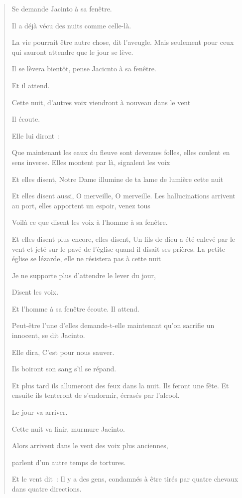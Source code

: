 \begin{quote}
Se demande Jacinto à sa fenêtre.

Il a déjà vécu des nuits comme celle-là.

La vie pourrait être autre chose, dit l'aveugle. Mais seulement pour
ceux qui sauront attendre que le jour se lève.

Il se lèvera bientôt, pense Jacicnto à sa fenêtre.

Et il attend.

Cette nuit, d'autres voix viendront à nouveau dans le vent

Il écoute.

Elle lui diront~:

Que maintenant les eaux du fleuve sont devenues folles, elles coulent en
sens inverse. Elles montent par là, signalent les voix

Et elles disent, Notre Dame illumine de ta lame de lumière cette nuit

Et elles disent aussi, O merveille, O merveille. Les hallucinations
arrivent au port, elles apportent un espoir, venez tous

Voilà ce que disent les voix à l'homme à sa fenêtre.

Et elles disent plus encore, elles disent, Un fils de dieu a été enlevé
par le vent et jeté sur le pavé de l'église quand il disait ses prières.
La petite église se lézarde, elle ne résistera pas à cette nuit

Je ne supporte plus d'attendre le lever du jour,

Disent les voix.

Et l'homme à sa fenêtre écoute. Il attend.

Peut-être l'une d'elles demande-t-elle maintenant qu'on sacrifie un
innocent, se dit Jacinto.

Elle dira, C'est pour nous sauver.

Ils boiront son sang s'il se répand.

Et plus tard ils allumeront des feux dans la nuit. Ils feront une fête.
Et ensuite ils tenteront de s'endormir, écrasés par l'alcool.

Le jour va arriver.

Cette nuit va finir, murmure Jacinto.

Alors arrivent dans le vent des voix plus anciennes,

parlent d'un autre temps de tortures.

Et le vent dit~: Il y a des gens, condamnés à être tirés par quatre
chevaux dans quatre directions.


\end{quote}
